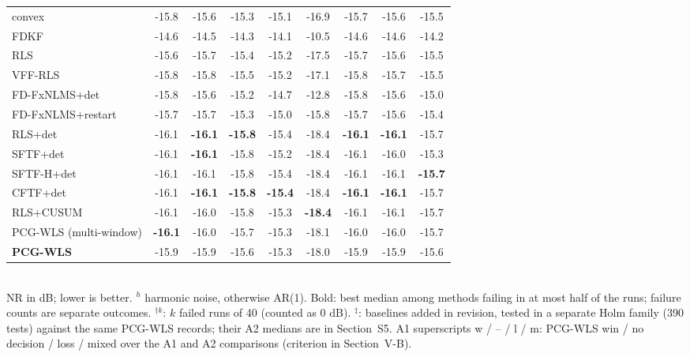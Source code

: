 \begin{table}[t]
{\begin{tabular}{lcccccccc}
convex & -15.8 & -15.6 & -15.3 & -15.1 & -16.9 & -15.7 & -15.6 & -15.5 \\
FDKF & -14.6 & -14.5 & -14.3 & -14.1 & -10.5 & -14.6 & -14.6 & -14.2 \\
RLS & -15.6 & -15.7 & -15.4 & -15.2 & -17.5 & -15.7 & -15.6 & -15.5 \\
VFF-RLS & -15.8 & -15.8 & -15.5 & -15.2 & -17.1 & -15.8 & -15.7 & -15.5 \\
FD-FxNLMS+det & -15.8 & -15.6 & -15.2 & -14.7 & -12.8 & -15.8 & -15.6 & -15.0 \\
FD-FxNLMS+restart & -15.7 & -15.7 & -15.3 & -15.0 & -15.8 & -15.7 & -15.6 & -15.4 \\
RLS+det & -16.1 & \textbf{-16.1} & \textbf{-15.8} & -15.4 & -18.4 & \textbf{-16.1} & \textbf{-16.1} & -15.7 \\
SFTF+det & -16.1 & \textbf{-16.1} & -15.8 & -15.2 & -18.4 & -16.1 & -16.0 & -15.3 \\
SFTF-H+det & -16.1 & -16.1 & -15.8 & -15.4 & -18.4 & -16.1 & -16.1 & \textbf{-15.7} \\
CFTF+det & -16.1 & \textbf{-16.1} & \textbf{-15.8} & \textbf{-15.4} & -18.4 & \textbf{-16.1} & \textbf{-16.1} & -15.7 \\
RLS+CUSUM & -16.1 & -16.0 & -15.8 & -15.3 & \textbf{-18.4} & -16.1 & -16.1 & -15.7 \\
PCG-WLS (multi-window) & \textbf{-16.1} & -16.0 & -15.7 & -15.3 & -18.1 & -16.0 & -16.0 & -15.7 \\
\textbf{PCG-WLS} & -15.9 & -15.9 & -15.6 & -15.3 & -18.0 & -15.9 & -15.9 & -15.6 \\
\bottomrule
\end{tabular}}
\\[2pt]{\scriptsize NR in dB; lower is better. $^h$ harmonic noise, otherwise AR(1). Bold: best median among methods failing in at most half of the runs; failure counts are separate outcomes. $^{\dagger k}$: $k$ failed runs of 40 (counted as 0 dB). $^\ddagger$: baselines added in revision, tested in a separate Holm family (390 tests) against the same PCG-WLS records; their A2 medians are in Section~S5.} {\scriptsize A1 superscripts w / -- / l / m: PCG-WLS win / no decision / loss / mixed over the A1 and A2 comparisons (criterion in Section~V-B).}
\end{table}

